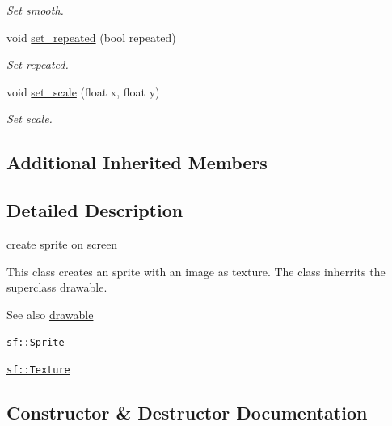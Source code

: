 \begin{DoxyCompactItemize}
\begin{DoxyCompactList}\small\item\em Set smooth. \end{DoxyCompactList}\item 
void \hyperlink{classimage__from__file_abaf0ebde2771171fdf91b55f4f6c5aa6}{set\+\_\+repeated} (bool repeated)
\begin{DoxyCompactList}\small\item\em Set repeated. \end{DoxyCompactList}\item 
void \hyperlink{classimage__from__file_a698cd91783bb6c2211ea5a3702ca60a8}{set\+\_\+scale} (float x, float y)
\begin{DoxyCompactList}\small\item\em Set scale. \end{DoxyCompactList}\end{DoxyCompactItemize}
\subsection*{Additional Inherited Members}


\subsection{Detailed Description}
create sprite on screen 

This class creates an sprite with an image as texture. The class inherrits the superclass drawable.

\begin{DoxySeeAlso}{See also}
\hyperlink{classdrawable}{drawable} 

\href{https://www.sfml-dev.org/documentation/2.0/classsf_1_1Sprite.php }{\tt sf\+::\+Sprite} 

\href{https://www.sfml-dev.org/documentation/2.0/classsf_1_1Texture.php}{\tt sf\+::\+Texture} 
\end{DoxySeeAlso}


\subsection{Constructor \& Destructor Documentation}
\mbox{\label{classimage__from__file_a08fd7ad55a2eb520242e31ff3cdf2663}} 
